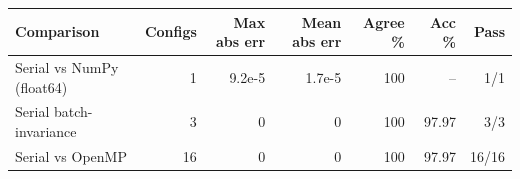 \begin{tabular}{lrrrrrr}
\toprule
Comparison & Configs & Max abs err & Mean abs err & Agree \% & Acc \% & Pass \\
\midrule
Serial vs NumPy (float64) & 1 & 9.2e-5 & 1.7e-5 & 100 & -- & 1/1 \\
Serial batch-invariance & 3 & 0 & 0 & 100 & 97.97 & 3/3 \\
Serial vs OpenMP & 16 & 0 & 0 & 100 & 97.97 & 16/16 \\
\bottomrule
\end{tabular}
